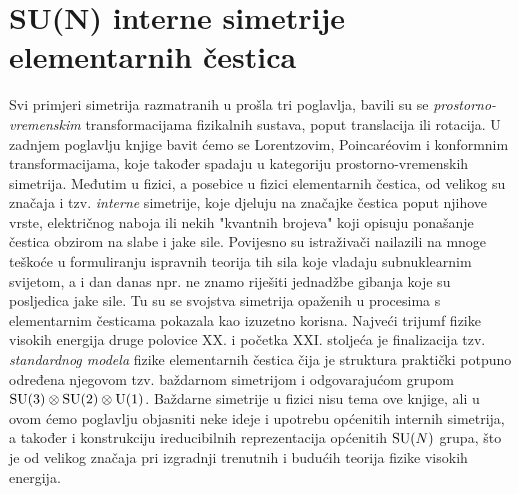 
\chapter{SU(N) interne simetrije elementarnih čestica}

Svi primjeri simetrija razmatranih u prošla tri poglavlja,
bavili su se \emph{prostorno-vremenskim} transformacijama fizikalnih
sustava, poput translacija ili rotacija. U zadnjem poglavlju knjige
bavit ćemo se Lorentzovim, Poincar\'{e}ovim i konformnim
transformacijama, koje također spadaju u kategoriju prostorno-vremenskih simetrija.
Međutim u fizici, a posebice u fizici elementarnih čestica,
od velikog su značaja i tzv. \emph{interne} simetrije, koje
djeluju na značajke čestica poput njihove vrste, električnog
naboja ili nekih "kvantnih brojeva" koji opisuju
ponašanje čestica obzirom na  slabe i jake sile.
Povijesno su istraživači nailazili na mnoge teškoće u formuliranju
ispravnih teorija tih sila koje vladaju subnuklearnim svijetom,
a i dan danas npr. ne znamo riješiti jednadžbe
gibanja koje su posljedica jake sile. Tu su se svojstva simetrija
opaženih u procesima s elementarnim česticama pokazala kao izuzetno korisna.
Najveći trijumf fizike visokih energija druge polovice XX. i početka
XXI. stoljeća je finalizacija tzv. \emph{standardnog modela} fizike elementarnih
čestica čija je struktura praktički potpuno određena njegovom
tzv. baždarnom simetrijom i odgovarajućom grupom $\mathrm{SU}(3) \otimes \mathrm{SU}(2) \otimes \mathrm{U}(1)$. 
Baždarne simetrije u fizici nisu tema ove knjige, ali u ovom ćemo poglavlju
objasniti neke ideje i upotrebu općenitih internih simetrija, a također
i konstrukciju ireducibilnih reprezentacija općenitih $\mathrm{SU}(N)$ grupa,
što je od velikog značaja pri izgradnji trenutnih i budućih teorija
fizike visokih energija.



